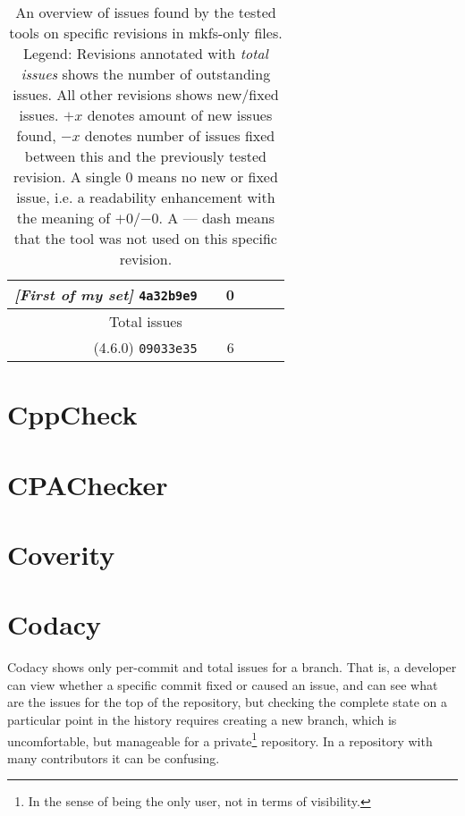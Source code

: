 \begin{table}[h]
\begin{tabular}{|r||r|r|r|r|r|}
\hline
{\em [First of my set]} {\tt 4a32b9e9} & & 0 & & & \\
\hline
\hline
\multicolumn{6}{|c|}{Total issues} \\
\hline
(4.6.0) {\tt 09033e35} & & 6 & & & \\
\hline
\end{tabular}
\caption{An overview of issues found by the tested tools on specific
	revisions in mkfs-only files.\newline
	\newline
	Legend: Revisions annotated with {\em total issues} shows the
	number of outstanding issues. All other revisions shows new/fixed
	issues.  $+x$ denotes amount of new issues found, $-x$ denotes
	number of issues fixed between this and the previously tested
revision. A single 0 means no new or fixed issue, i.e. a readability
enhancement with the meaning of $+0$/$-0$. A --- dash means that the tool
was not used on this specific revision.}


\label{tab:results:overview}
\end{table}

\section{CppCheck}\label{chap:results:cppcheck}

\section{CPAChecker}\label{chap:results:cpachecker}

\section{Coverity}\label{chap:results:coverity}

\section{Codacy}\label{chap:results:codacy}
Codacy shows only per-commit and total issues for a branch. That is, a
developer can view whether a specific commit fixed or caused an issue, and
can see what are the issues for the top of the repository, but checking the
complete state on a particular point in the history requires creating a new
branch, which is uncomfortable, but manageable for a private\footnote{In
the sense of being the only user, not in terms of visibility.} repository.
In a repository with many contributors it can be confusing.

